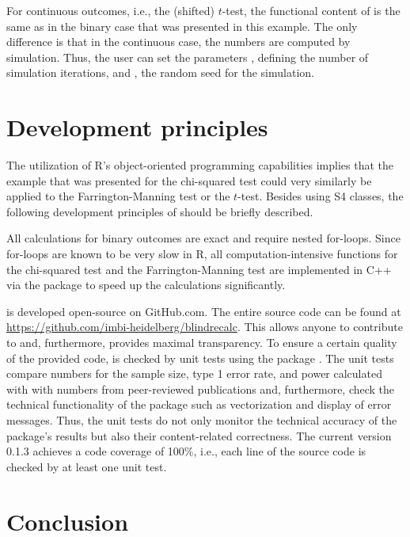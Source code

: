 For continuous outcomes, i.e., the (shifted) \(t\)-test, the functional
content of  is the same as in the binary case that was
presented in this example. The only difference is that in the continuous
case, the numbers are computed by simulation. Thus, the user can set the
parameters , defining the number of simulation iterations,
and , the random seed for the simulation.

\hypertarget{development-principles}{%
\section{Development principles}\label{development-principles}}

The utilization of R's object-oriented programming capabilities implies
that the example that was presented for the chi-squared test could very
similarly be applied to the Farrington-Manning test or the \(t\)-test.
Besides using S4 classes, the following development principles of
 should be briefly described.

All calculations for binary outcomes are exact and require nested
for-loops. Since for-loops are known to be very slow in R, all
computation-intensive functions for the chi-squared test and the
Farrington-Manning test are implemented in C++ via the 
package \citep{Rcpp} to speed up the calculations significantly.

 is developed open-source on GitHub.com. The entire
source code can be found at
\url{https://github.com/imbi-heidelberg/blindrecalc}. This allows anyone
to contribute to  and, furthermore, provides maximal
transparency. To ensure a certain quality of the provided code,
 is checked by unit tests using the package
 \citep{covr}. The unit tests compare numbers for the
sample size, type 1 error rate, and power calculated with
 with numbers from peer-reviewed publications and,
furthermore, check the technical functionality of the package such as
vectorization and display of error messages. Thus, the unit tests do not
only monitor the technical accuracy of the package's results but also
their content-related correctness. The current version 
0.1.3 achieves a code coverage of 100\%, i.e., each line of the source
code is checked by at least one unit test.

\hypertarget{conclusion}{%
\section{Conclusion}\label{conclusion}}

